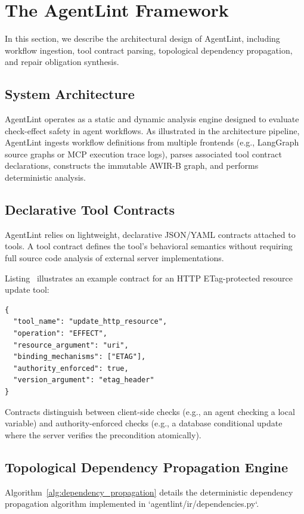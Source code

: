 \section{The AgentLint Framework}
\label{sec:framework}

In this section, we describe the architectural design of AgentLint, including workflow ingestion, tool contract parsing, topological dependency propagation, and repair obligation synthesis.

\subsection{System Architecture}
AgentLint operates as a static and dynamic analysis engine designed to evaluate check-effect safety in agent workflows. As illustrated in the architecture pipeline, AgentLint ingests workflow definitions from multiple frontends (e.g., LangGraph source graphs or MCP execution trace logs), parses associated tool contract declarations, constructs the immutable \textsf{AWIR-B} graph, and performs deterministic analysis.

\subsection{Declarative Tool Contracts}
AgentLint relies on lightweight, declarative JSON/YAML contracts attached to tools. A tool contract defines the tool's behavioral semantics without requiring full source code analysis of external server implementations.

Listing~\cite{mcp2024spec} illustrates an example contract for an HTTP ETag-protected resource update tool:
\begin{verbatim}
{
  "tool_name": "update_http_resource",
  "operation": "EFFECT",
  "resource_argument": "uri",
  "binding_mechanisms": ["ETAG"],
  "authority_enforced": true,
  "version_argument": "etag_header"
}
\end{verbatim}

Contracts distinguish between client-side checks (e.g., an agent checking a local variable) and authority-enforced checks (e.g., a database conditional update where the server verifies the precondition atomically).

\subsection{Topological Dependency Propagation Engine}
Algorithm~\ref{alg:dependency_propagation} details the deterministic dependency propagation algorithm implemented in `agentlint/ir/dependencies.py`.

